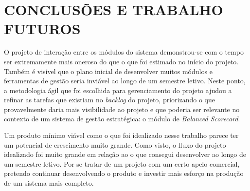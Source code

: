 \documentclass{abnt}
\begin{document}

\chapter{CONCLUSÕES E TRABALHO FUTUROS}

O projeto de interação entre os módulos do sistema demonstrou-se com o tempo ser
extremamente mais oneroso do que o que foi estimado no início do projeto. Também
é visível que o plano inicial de desenvolver muitos módulos e ferramentas de
gestão seria inviável ao longo de um semestre letivo. Neste ponto, a metodologia
ágil que foi escolhida para gerenciamento do projeto ajudou a refinar as tarefas
que existiam no \textit{backlog} do projeto, priorizando o que provavelmente
daria mais visibilidade ao projeto e que poderia ser relevante no contexto de um
sistema de gestão estratégica: o módulo de \textit{Balanced Scorecard}.


Um produto mínimo viável como o que foi idealizado nesse trabalho parece ter um
potencial de crescimento muito grande. Como visto, o fluxo do projeto idealizado
foi muito grande em relação ao o que consegui desenvolver ao longo de um
semestre letivo. Por se tratar de um projeto com um certo apelo comercial,
pretendo continuar desenvolvendo o produto e investir mais esforço na produção
de um sistema mais completo.



\end{document}
